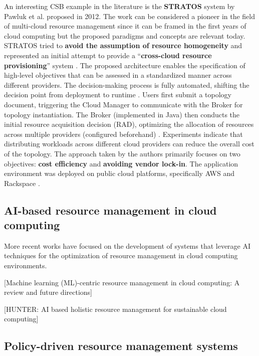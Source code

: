 An interesting CSB example in the literature is the \textbf{STRATOS} system by Pawluk et al. proposed in 2012. The work can be considered a pioneer in the field of multi-cloud resource management since it can be framed in the first years of cloud computing \cite{STRATOS} but the proposed paradigms and concepts are relevant today.
STRATOS tried to \textbf{avoid the assumption of resource homogeneity} and represented an initial attempt to provide a ``\textbf{cross-cloud resource provisioning}'' system \cite{STRATOS}.
The proposed architecture enables the specification of high-level objectives that can be assessed in a standardized manner across different providers. The decision-making process is fully automated, shifting the decision point from deployment to runtime \cite{STRATOS}.
Users first submit a topology document, triggering the Cloud Manager to communicate with the Broker for topology instantiation. The Broker (implemented in Java) then conducts the initial resource acquisition decision (RAD), optimizing the allocation of resources across multiple providers (configured beforehand) \cite{STRATOS}.
Experiments indicate that distributing workloads across different cloud providers can reduce the overall cost of the topology. The approach taken by the authors primarily focuses on two objectives: \textbf{cost efficiency} and \textbf{avoiding vendor lock-in}. The application environment was deployed on public cloud platforms, specifically AWS and Rackspace \cite{STRATOS}.

\subsection{AI-based resource management in cloud computing}
\label{sec:ai_based_resource_management}

More recent works have focused on the development of systems that leverage AI techniques for the optimization of resource management in cloud computing environments.

[Machine learning (ML)-centric resource management in cloud computing: A review and future directions]

[HUNTER: AI based holistic resource management for sustainable cloud computing]

\subsection{Policy-driven resource management systems}

